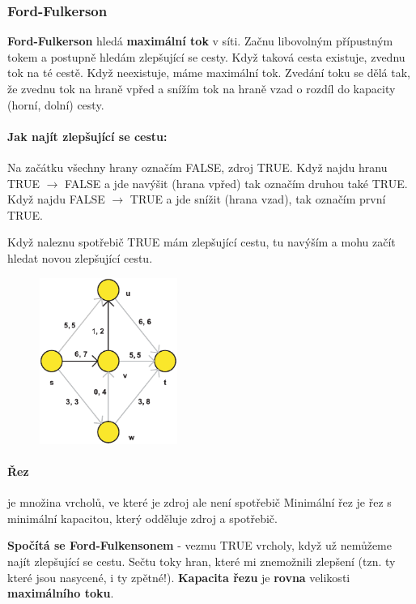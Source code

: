 \subsubsection{Ford-Fulkerson}
\textbf{Ford-Fulkerson} hledá \textbf{maximální tok} v síti. Začnu libovolným přípustným tokem a postupně hledám zlepšující se cesty. Když taková cesta existuje, zvednu tok na té cestě. Když neexistuje, máme maximální tok. Zvedání toku se dělá tak, že zvednu tok na hraně vpřed a snížím tok na hraně vzad o rozdíl do kapacity (horní, dolní) cesty.

\paragraph{Jak najít zlepšující se cestu:} Na začátku všechny hrany označím FALSE, zdroj TRUE. Když najdu hranu TRUE $\rightarrow$ FALSE a jde navýšit (hrana vpřed) tak označím druhou také TRUE. Když najdu FALSE $\rightarrow$ TRUE a jde snížit (hrana vzad), tak označím první TRUE.

Když naleznu spotřebič TRUE mám zlepšující cestu, tu navýším a mohu začít hledat novou zlepšující cestu.


\begin{figure}
  \begin{center}
    \vspace{-20px}
    \includegraphics[width=45mm]{08/images/toky}
    \vspace{-10px}
  \end{center}
\end{figure}

\paragraph{Řez} je množina vrcholů, ve které je zdroj ale není spotřebič Minimální řez je řez s minimální kapacitou, který odděluje zdroj a spotřebič.

\textbf{Spočítá se Ford-Fulkensonem} - vezmu TRUE vrcholy, když už nemůžeme najít zlepšující se cestu. Sečtu toky hran, které mi znemožnili zlepšení (tzn. ty které jsou nasycené, i ty zpětné!). \textbf{Kapacita řezu} je \textbf{rovna} velikosti \textbf{maximálního toku}.

